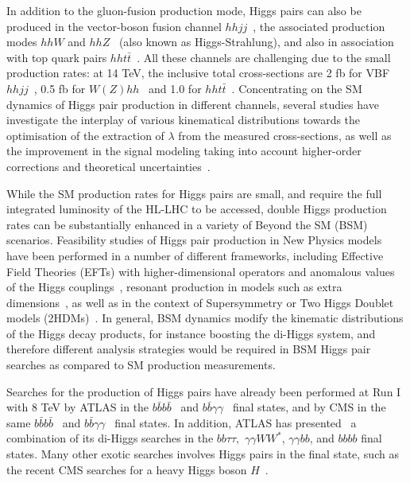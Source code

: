 In addition to the gluon-fusion production mode, Higgs pairs
can also be produced in the vector-boson fusion
channel $hhjj$~\cite{Contino:2010mh,Dolan:2013rja,Dolan:2015zja,
  Brooijmans:2014eja},
the associated production modes
$hhW$ and $hhZ$~\cite{Barger:1988jk,baglio,Cao:2015oxx}
(also known as Higgs-Strahlung),
and also in association
with top quark pairs $hht\bar{t}$~\cite{Englert:2014uqa}.
%
All these channels are challenging due to the small production
rates: at 14 TeV, the inclusive total cross-sections are
2 fb for VBF $hhjj$~\cite{Liu-Sheng:2014gxa},
0.5 fb for $W(Z)hh$~\cite{baglio}
and 1.0 for $hht\bar{t}$~\cite{Englert:2014uqa}.
%
Concentrating on the SM dynamics of Higgs pair production
in different channels, several studies
have investigate the interplay of various kinematical
distributions towards the optimisation of the
extraction of $\lambda$ from the measured
cross-sections, as well as the improvement
in the signal modeling taking into account
higher-order corrections and theoretical
uncertainties~\cite{Slawinska:2014vpa,Chen:2014xra,Goertz:2013kp,
  Frederix:2014hta,Dawson:2015oha,Maltoni:2014eza,Maierhofer:2013sha,Grigo:2013rya,Grigo:2014jma}.
%


While the SM production rates for Higgs
pairs are small,
and require the full integrated luminosity of the HL-LHC
to be accessed, double Higgs production rates can be substantially
enhanced in a variety of Beyond the SM (BSM) scenarios.
%
Feasibility studies of Higgs pair production in New Physics
models have been performed in a number of different frameworks,
including Effective Field
Theories (EFTs) with higher-dimensional
operators and anomalous values of the
Higgs couplings~\cite{Nishiwaki:2013cma,Dall'Osso:2015aia,Azatov:2015oxa,Liu:2014rba,Goertz:2014qta,He:2015spf,Grober:2015cwa}, resonant production
in models such as extra dimensions~\cite{Gouzevitch:2013qca,Cooper:2013kia,No:2013wsa}, as well as
in the context of Supersymmetry or Two Higgs Doublet models (2HDMs)~\cite{Belyaev:1999kk,Han:2013sga,Hespel:2014sla,Wu:2015nba,Cao:2014kya,Ellwanger:2013ova}.
%
In general, BSM dynamics modify
the kinematic distributions of the Higgs decay products, for
instance boosting the di-Higgs system, and therefore
different analysis strategies would be required in BSM
Higgs pair searches as compared to SM production measurements.


Searches for the production of Higgs pairs
have already been performed at Run I with 8 TeV
by ATLAS in the $b\bar{b}b\bar{b}$~\cite{Aad:2015uka}
and $b\bar{b}\gamma\gamma$~\cite{Aad:2014yja} final states,
and by
CMS in the same $b\bar{b}b\bar{b}$~\cite{Khachatryan:2015yea}
and $b\bar{b}\gamma\gamma$~\cite{Chatrchyan:2011wt} final
states.
%
%
In addition, ATLAS has presented~\cite{Aad:2015xja} a combination
of its di-Higgs searches in the $bb\tau\tau,$
$\gamma\gamma WW^*$, $\gamma\gamma bb$, and $bbbb$ final states.
%
Many other exotic searches involves Higgs pairs in the final
state, such as the recent
CMS searches for a heavy Higgs boson $H$~\cite{Khachatryan:2015tha}.



